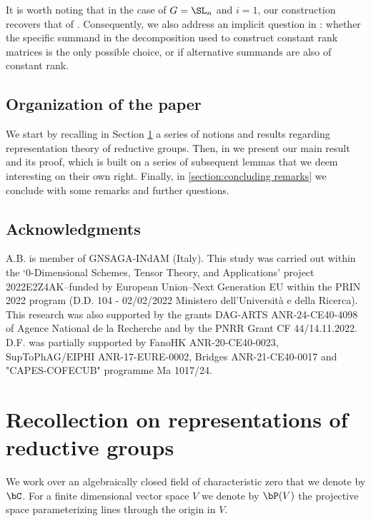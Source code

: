 \documentclass[reqno, 10pt]{amsart}
\theoremstyle{plain}
\theoremstyle{definition}
\numberwithin{equation}{section}%
\begin{document}
\smallskip

It is worth noting that in the case of $G=\SL_n$ and $i=1$, our construction recovers that of  \cite{BFL2}. Consequently, we also address an implicit question in \cite{BFL2}: whether the specific summand in the decomposition used to construct constant rank matrices is the only possible choice, or if alternative summands are also of constant rank.

\smallskip

\subsection*{Organization of the paper}
We start by recalling in Section
\ref{section: recollection} a series of notions and results regarding representation theory of reductive groups.
Then, in  we present our main result and its proof, which is built on a series of subsequent lemmas that we deem interesting on their own right. 
Finally, in \cref{section:concluding remarks} we conclude with some remarks and further questions.

\subsection*{Acknowledgments} A.B. is member of GNSAGA-INdAM (Italy). This study was carried out within the `0-Dimensional Schemes, Tensor Theory, and Applications' project 2022E2Z4AK--funded by European Union--Next Generation EU  within the PRIN 2022 program (D.D. 104 - 02/02/2022 Ministero dell'Universit\`a e della Ricerca).
This research was also supported by the grants DAG-ARTS ANR-24-CE40-4098 of Agence National de la Recherche and by the PNRR Grant CF 44/14.11.2022.
D.F. was partially supported by FanoHK ANR-20-CE40-0023, SupToPhAG/EIPHI
ANR-17-EURE-0002, Bridges
ANR-21-CE40-0017 and "CAPES-COFECUB" programme Ma 1017/24.



\section{Recollection on representations of reductive groups}
\label{section: recollection}

We work over an algebraically closed field of characteristic zero that
we denote by $\bC$. For a finite dimensional vector space $V$ we
denote by $\bP(V)$ the projective space parameterizing lines through
the origin in $V$.
\end{document}
